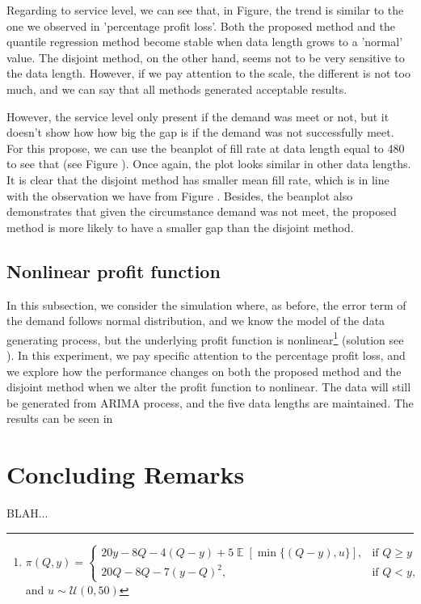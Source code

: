 \documentclass{article}
\DeclareMathOperator{\E}{\mathbb{E}}
\begin{document}
Regarding to service level, we can see that, in Figure, the trend is similar to the one we observed in 'percentage profit loss'. Both the proposed method and the quantile regression method become stable when data length grows to a 'normal' value. The disjoint method, on the other hand, seems not to be very sensitive to the data length. However, if we pay attention to the scale, the different is not too much, and we can say that all methods generated acceptable results.

However, the service level only present if the demand was meet or not, but it doesn't show how how big the gap is if the demand was not successfully meet. For this propose, we can use the beanplot of fill rate at data length equal to 480 to see that (see Figure ). Once again, the plot looks similar in other data lengths. It is clear that the disjoint method has smaller mean fill rate, which is in line with the observation we have from Figure . Besides, the beanplot also demonstrates that given the circumstance demand was not meet, the proposed method is more likely to have a smaller gap than the disjoint method.  
\subsection{Nonlinear profit function}
In this subsection, we consider the simulation where, as before, the error term of the demand follows normal distribution, and we know the model of the data generating process, but the underlying profit function is nonlinear\footnote{$
        \pi(Q,y)=
        \begin{cases}
            20y-8Q-4(Q-y)+5\E[\min \{(Q-y),u\}],& \text{if } Q\geq y\\
            20Q-8Q-7(y-Q)^2,& \text{if } Q< y,
        \end{cases}$ and $u\sim \mathcal{U}(0,50)$} (solution see \cite{KK18}). 
In this experiment, we pay specific attention to the percentage profit loss, and we explore how the performance changes on both the proposed method and the disjoint method when we alter the profit function to nonlinear. The data will still be generated from ARIMA process, and the five data lengths are maintained. The results can be seen in 

\section{Concluding Remarks} \label{se:end}

BLAH...
\end{document}
